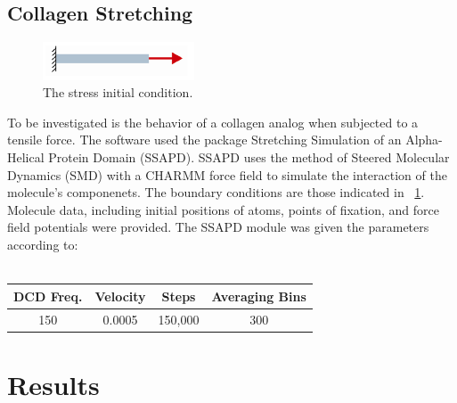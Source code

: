 \documentclass[11pt]{report}
\begin{document}
        \subsection{Collagen Stretching}
        \begin{figure}[!htb]
            \label{fig:applied-stress-partB}
            \centering
            \includegraphics[width=0.4\textwidth]{applied-stress-partB.png}
            \caption{The stress initial condition.}
        \end{figure}
        To be investigated is the behavior of a collagen analog when subjected to a tensile force.  The software used the package Stretching Simulation of an Alpha-Helical Protein Domain (SSAPD).  SSAPD uses the method of Steered Molecular Dynamics (SMD) with a CHARMM force field to simulate the interaction of the molecule's componenets.  The boundary conditions are those indicated in ~\ref{fig:applied-stress-partB}.  Molecule data, including initial positions of atoms, points of fixation, and force field potentials were provided.  The SSAPD module was given the parameters according to:\\
        \\
        \begin{tabular}[!htb]{|c|c|c|c|}
            \hline
            DCD Freq. & Velocity & Steps & Averaging Bins \\
            \hline
            150 & 0.0005 & 150,000 & 300 \\
            \hline
        \end{tabular}

    \section{Results}
\end{document}
